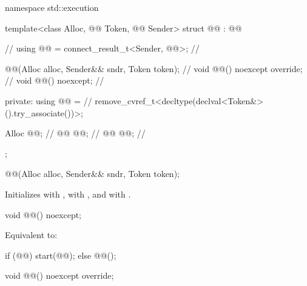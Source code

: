 %
\begin{codeblock}
namespace std::execution {
  template<class Alloc, @@ Token, @@ Sender>
  struct @@ : @@ {                   // \expos
    using @@ = connect_result_t<Sender, @@>;  // \expos

    @@(Alloc alloc, Sender&& sndr, Token token);   // \expos
    void @@() noexcept override;                      // \expos
    void @@() noexcept;                                    // \expos

  private:
    using @@ =                                         // \expos
      remove_cvref_t<decltype(declval<Token&>().try_associate())>;

    Alloc @@;                                            // \expos
    @@ @@;                                                // \expos
    @@ @@;                                          // \expos
  };
}
\end{codeblock}

%
\begin{itemdecl}
@@(Alloc alloc, Sender&& sndr, Token token);
\end{itemdecl}

\begin{itemdescr}
\pnum
\effects
Initializes
 with ,
 with , and
 with .
\end{itemdescr}

%
\begin{itemdecl}
void @@() noexcept;
\end{itemdecl}

\begin{itemdescr}
\pnum
\effects
Equivalent to:
\begin{codeblock}
if (@@)
  start(@@);
else
  @@();
\end{codeblock}
\end{itemdescr}

%
\begin{itemdecl}
void @@() noexcept override;
\end{itemdecl}

